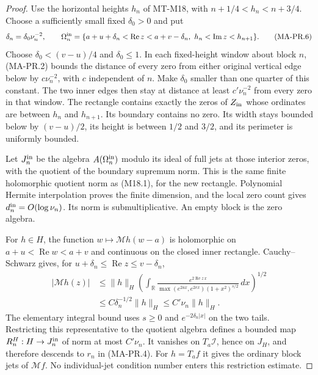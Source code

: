 \begin{proof}
Use the horizontal heights $h_n$ of MT-M18, with
$n+1/4<h_n<n+3/4$.  Choose a sufficiently small fixed
$\delta_0>0$ and put
\[
 \delta_n=\delta_0\nu_n^{-2},\qquad
 \Omega_n^{\rm in}
   =\{a+u+\delta_n<\operatorname{Re}z<a+v-\delta_n,\
                          h_n<\operatorname{Im}z<h_{n+1}\}.
\tag{MA-PR.6}
\]
Choose $\delta_0<(v-u)/4$ and $\delta_0\le1$.
In each fixed-height window about block $n$, (MA-PR.2)
bounds the distance of every zero from either original
vertical edge below by $c\nu_n^{-2}$, with $c$ independent
of $n$.  Make $\delta_0$ smaller than one quarter of this
constant.  The two inner edges then stay at distance at
least $c'\nu_n^{-2}$ from every zero in that window.
The rectangle contains exactly the zeros of $Z_{\rm in}$
whose ordinates are between $h_n$ and $h_{n+1}$.
Its boundary contains no zero.  Its width stays bounded
below by $(v-u)/2$, its height is between $1/2$ and $3/2$,
and its perimeter is uniformly bounded.

Let $J_n^{\rm in}$ be the algebra $A(\Omega_n^{\rm in})$
modulo its ideal of full jets at those interior zeros,
with the quotient of the boundary supremum norm.
This is the same finite holomorphic quotient norm as
(M18.1), for the new rectangle.  Polynomial Hermite
interpolation proves the finite dimension, and the local
zero count gives $d_n^{\rm in}=O(\log\nu_n)$.
Its norm is submultiplicative.  An empty block is the zero
algebra.

For $h\in H$, the function
$w\mapsto\mathcal Mh(w-a)$ is holomorphic on
$a+u<\operatorname{Re}w<a+v$ and continuous on the
closed inner rectangle.  Cauchy--Schwarz gives, for
$u+\delta_n\le\operatorname{Re}z\le v-\delta_n$,
\[
\begin{aligned}
 |\mathcal Mh(z)|
 &\le\|h\|_H
  \left(\int_{\mathbb R}
       \frac{e^{2\operatorname{Re}z\,x}}
            {\max(e^{2ux},e^{2vx})(1+x^2)^{s/2}}\,dx\right)^{1/2}\\
 &\le C\delta_n^{-1/2}\|h\|_H
 \le C'\nu_n\|h\|_H .
\end{aligned}
\tag{MA-PR.7}
\]
The elementary integral bound uses $s\ge0$ and
$e^{-2\delta_n|x|}$ on the two tails.  Restricting this
representative to the quotient algebra defines a bounded
map $R_n^H:H\to J_n^{\rm in}$ of norm at most $C'\nu_n$.
It vanishes on $T_a\mathcal I$, hence on $J_H$, and
therefore descends to $r_n$ in (MA-PR.4).
For $h=T_af$ it gives the ordinary block jets of
$\mathcal Mf$.  No individual-jet condition number enters
this restriction estimate.


\end{proof}
